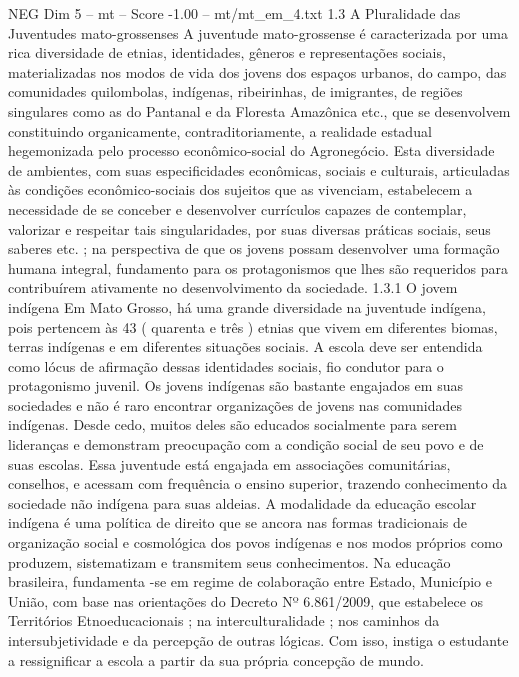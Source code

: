 \begin{textsample}{NEG Dim 5 – mt – Score -1.00 – mt/mt\_em\_4.txt}  \label{ex:f5_neg_210}
1.3 A Pluralidade das Juventudes mato-grossenses A juventude mato-grossense é caracterizada por uma rica diversidade de etnias, identidades, gêneros e representações sociais, materializadas nos modos de vida dos jovens dos espaços urbanos, do campo, das comunidades quilombolas, indígenas, ribeirinhas, de imigrantes, de regiões singulares como as do Pantanal e da Floresta Amazônica etc., que se desenvolvem constituindo organicamente, contraditoriamente, a realidade estadual hegemonizada pelo processo econômico-social do Agronegócio.
Esta diversidade de ambientes, com suas especificidades econômicas, sociais e culturais, articuladas às condições econômico-sociais dos sujeitos que as vivenciam, estabelecem a necessidade de se conceber e desenvolver currículos capazes de contemplar, valorizar e respeitar tais singularidades, por suas diversas práticas sociais, seus saberes etc. ; na perspectiva de que os jovens possam desenvolver uma formação humana integral, fundamento para os protagonismos que lhes são requeridos para contribuírem ativamente no desenvolvimento da sociedade. 1.3.1 O jovem indígena Em Mato Grosso, há uma grande diversidade na juventude indígena, pois pertencem às 43 ( quarenta e três ) etnias que vivem em diferentes biomas, terras indígenas e em diferentes situações sociais.
A escola deve ser entendida como lócus de afirmação dessas identidades sociais, fio condutor para o protagonismo juvenil.
Os jovens indígenas são bastante engajados em suas sociedades e não é raro encontrar organizações de jovens nas comunidades indígenas.
Desde cedo, muitos deles são educados socialmente para serem lideranças e demonstram preocupação com a condição social de seu povo e de suas escolas.
Essa juventude está engajada em associações comunitárias, conselhos, e acessam com frequência o ensino superior, trazendo conhecimento da sociedade não indígena para suas aldeias.
A modalidade da educação escolar indígena é uma política de direito que se ancora nas formas tradicionais de organização social e cosmológica dos povos indígenas e nos modos próprios como produzem, sistematizam e transmitem seus conhecimentos.
Na educação brasileira, fundamenta -se em regime de colaboração entre Estado, Município e União, com base nas orientações do Decreto Nº 6.861/2009, que estabelece os Territórios Etnoeducacionais ; na interculturalidade ; nos caminhos da intersubjetividade e da percepção de outras lógicas.
Com isso, instiga o estudante a ressignificar a escola a partir da sua própria concepção de mundo.

\end{textsample}
